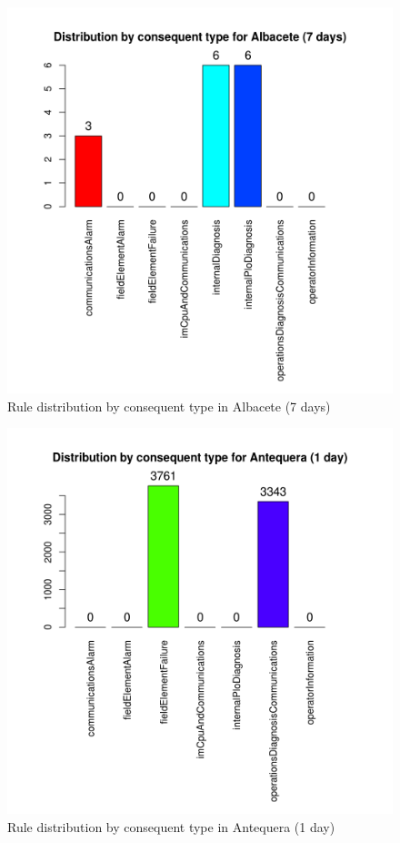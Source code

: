 \documentclass[a4paper,12pt]{article}
\begin{document}
\begin{figure}[hbtp]
\includegraphics[width=\textwidth]{img/conseqtypes_alb7.png}
\caption{Rule distribution by consequent type in Albacete (7 days)} \label{fig:conseqtypes_alb7}
\end{figure}

\begin{figure}[hbtp]
\includegraphics[width=\textwidth]{img/conseqtypes_ant1.png}
\caption{Rule distribution by consequent type in Antequera (1 day)} \label{fig:conseqtypes_ant1}
\end{figure}
\end{document}
